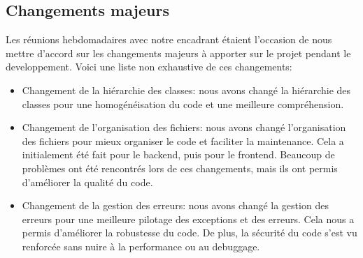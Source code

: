 \subsection{Changements majeurs}

Les réunions hebdomadaires avec notre encadrant étaient l'occasion de nous mettre d'accord sur
les changements majeurs à apporter sur le projet pendant le developpement. Voici une liste non exhaustive de ces changements:

\begin{itemize}
    \item Changement de la hiérarchie des classes: nous avons changé la hiérarchie des classes pour
    une homogénéisation du code et une meilleure compréhension.
    \item Changement de l'organisation des fichiers: nous avons changé l'organisation des fichiers pour
    mieux organiser le code et faciliter la maintenance. Cela a initialement été fait pour le backend, puis
    pour le frontend. Beaucoup de problèmes ont été rencontrés lors de ces changements, mais ils ont permis
    d'améliorer la qualité du code.
    \item Changement de la gestion des erreurs: nous avons changé la gestion des erreurs pour une meilleure
    pilotage des exceptions et des erreurs. Cela nous a permis d'améliorer la robustesse du code.
    De plus, la sécurité du code s'est vu renforcée sans nuire à la performance ou au debuggage.
\end{itemize}

